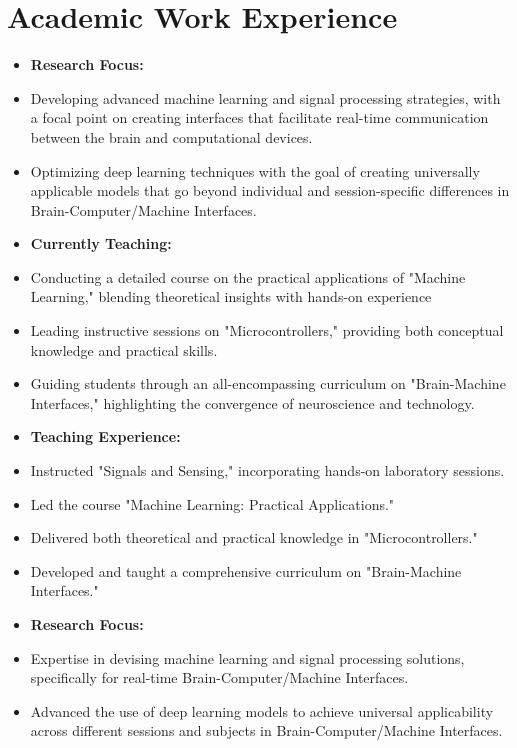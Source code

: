 \documentclass[10pt,letterpaper,sans]{moderncv}   %
\begin{document}
\section{Academic Work Experience}
{{
	\begin{itemize}%
		\item[] \textbf{Research Focus:}
		\item Developing advanced machine learning and signal processing strategies, with a focal point on creating interfaces that facilitate real-time communication between the brain and computational devices.
		\item Optimizing deep learning techniques with the goal of creating universally applicable models that go beyond individual and session-specific differences in Brain-Computer/Machine Interfaces.
		\item[] \textbf{Currently Teaching:}
		\item Conducting a detailed course on the practical applications of "Machine Learning," blending theoretical insights with hands-on experience
		\item Leading instructive sessions on "Microcontrollers," providing both conceptual knowledge and practical skills.
		\item Guiding students through an all-encompassing curriculum on "Brain-Machine Interfaces," highlighting the convergence of neuroscience and technology.
	\end{itemize}	
}}
{{
	\begin{itemize}%
		\item[] \textbf{Teaching Experience:}
		\item Instructed "Signals and Sensing," incorporating hands-on laboratory sessions.
		\item Led the course "Machine Learning: Practical Applications."
		\item Delivered both theoretical and practical knowledge in "Microcontrollers."
		\item Developed and taught a comprehensive curriculum on "Brain-Machine Interfaces."
		\item[] \textbf{Research Focus:}
		\item Expertise in devising machine learning and signal processing solutions, specifically for real-time Brain-Computer/Machine Interfaces.
		\item Advanced the use of deep learning models to achieve universal applicability across different sessions and subjects in Brain-Computer/Machine Interfaces.
	\end{itemize}	
}}
\end{document}
